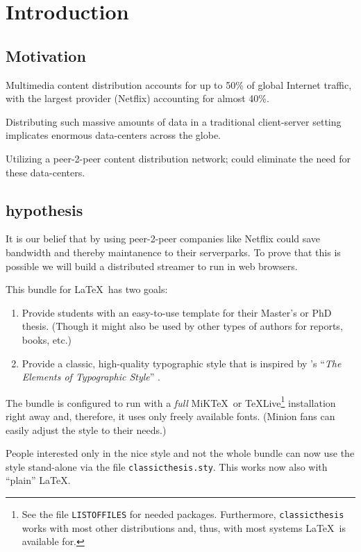\chapter{Introduction}\label{ch:introduction}
\section{Motivation}
Multimedia content distribution accounts for up to 50\% of global Internet
traffic, with the largest provider (Netflix) accounting for almost 40\%.

Distributing such massive amounts of data in a traditional client-server
setting implicates enormous data-centers across the globe.

Utilizing a peer-2-peer content distribution network; could eliminate the need
for these data-centers.%

\section{hypothesis}
It is our belief that by using peer-2-peer companies like Netflix could save bandwidth and thereby maintanence to their serverparks. To prove that this is possible we will build a distributed streamer to run in web browsers.


This bundle for \LaTeX\ has two goals:
\begin{enumerate}
    \item Provide students with an easy-to-use template for their
    Master's
    or PhD thesis. (Though it might also be used by other types of
    authors
    for reports, books, etc.)
    \item Provide a classic, high-quality typographic style that is
    inspired by \citeauthor{bringhurst:2002}'s ``\emph{The Elements of
    Typographic Style}'' \citep{bringhurst:2002}.
\end{enumerate}
The bundle is configured to run with a \emph{full} 
MiK\TeX\ or \TeX Live\footnote{See the file \texttt{LISTOFFILES} for
needed packages. Furthermore, \texttt{classicthesis} 
works with most other distributions and, thus, with most systems 
\LaTeX\ is available for.} 
installation right away and, therefore, it uses only freely available 
fonts. (Minion fans can easily adjust the style to their needs.)

People interested only in the nice style and not the whole bundle can
now use the style stand-alone via the file \texttt{classicthesis.sty}.
This works now also with ``plain'' \LaTeX.

